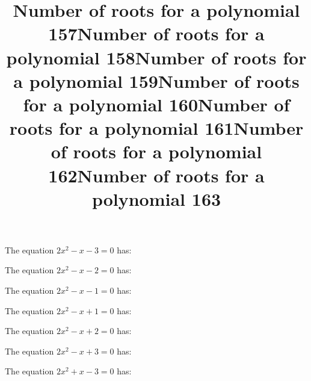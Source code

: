 \documentclass{article}
\begin{document}
\begin{category}
\begin{question}[multichoice]
\end{question}
\begin{question}[multichoice]
\title{Number of roots for a polynomial 157}
The equation $2 x^{2} - x - 3=0$ has:



\end{question}
\begin{question}[multichoice]
\title{Number of roots for a polynomial 158}
The equation $2 x^{2} - x - 2=0$ has:



\end{question}
\begin{question}[multichoice]
\title{Number of roots for a polynomial 159}
The equation $2 x^{2} - x - 1=0$ has:



\end{question}
\begin{question}[multichoice]
\title{Number of roots for a polynomial 160}
The equation $2 x^{2} - x + 1=0$ has:



\end{question}
\begin{question}[multichoice]
\title{Number of roots for a polynomial 161}
The equation $2 x^{2} - x + 2=0$ has:



\end{question}
\begin{question}[multichoice]
\title{Number of roots for a polynomial 162}
The equation $2 x^{2} - x + 3=0$ has:



\end{question}
\begin{question}[multichoice]
\title{Number of roots for a polynomial 163}
The equation $2 x^{2} + x - 3=0$ has:


\end{question}
\end{category}
\end{document}
